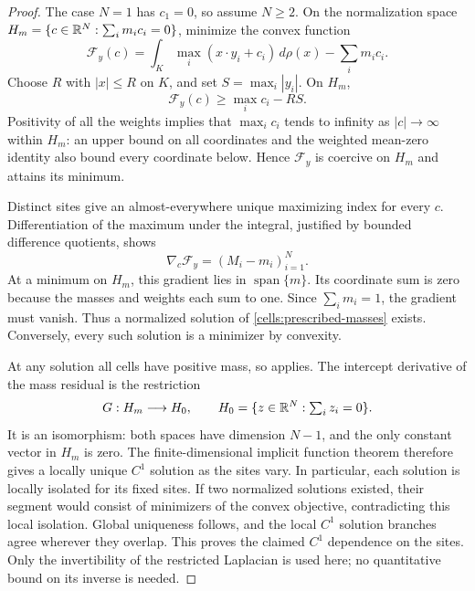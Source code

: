 \begin{proof}
The case $N=1$ has $c_1=0$, so assume $N\ge2$. On the normalization space
$H_m=\{c\in\mathbb R^N:\sum_i m_i c_i=0\}$, minimize the convex function
\[
 \mathcal F_y(c)=\int_K\max_i(x\cdot y_i+c_i)\,d\rho(x)
                  -\sum_i m_i c_i.
\]
Choose $R$ with $|x|\le R$ on $K$, and set $S=\max_i|y_i|$. On $H_m$,
\[
 \mathcal F_y(c)\ge\max_i c_i-RS.
\]
Positivity of all the weights implies that $\max_i c_i$ tends to infinity
as $|c|\to\infty$ within $H_m$: an upper bound on all coordinates and the
weighted mean-zero identity also bound every coordinate below. Hence
$\mathcal F_y$ is coercive on $H_m$ and attains its minimum.

Distinct sites give an almost-everywhere unique maximizing index for
every $c$. Differentiation of the maximum under the integral, justified
by bounded difference quotients, shows
\[
 \nabla_c\mathcal F_y=(M_i-m_i)_{i=1}^N.
\]
At a minimum on $H_m$, this gradient lies in $\operatorname{span}\{m\}$.
Its coordinate sum is zero because the masses and weights each sum to
one. Since $\sum_i m_i=1$, the gradient must vanish. Thus a normalized
solution of \eqref{cells:prescribed-masses} exists. Conversely, every such
solution is a minimizer by convexity.

At any solution all cells have positive mass, so 
applies. The intercept derivative of the mass residual is the restriction
\[
 G:H_m\longrightarrow H_0,
 \qquad H_0=\{z\in\mathbb R^N:\textstyle\sum_i z_i=0\}.
\]
It is an isomorphism: both spaces have dimension $N-1$, and the only
constant vector in $H_m$ is zero. The finite-dimensional implicit
function theorem therefore gives a locally unique $C^1$ solution as the
sites vary. In particular, each solution is locally isolated for its
fixed sites. If two normalized solutions existed, their segment would
consist of minimizers of the convex objective, contradicting this local
isolation. Global uniqueness follows, and the local $C^1$ solution
branches agree wherever they overlap. This proves the claimed $C^1$
dependence on the sites. Only the invertibility of the restricted
Laplacian is used here; no quantitative bound on its inverse is needed.
\end{proof}
